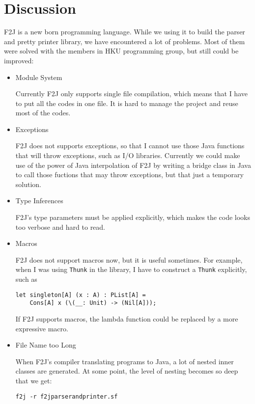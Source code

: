 \chapter{Discussion}

F2J is a new born programming language. While we using it to build the parser and pretty printer library, we have encountered a lot of problems. Most of them were solved with the members in HKU programming group, but still could be improved:

\begin{itemize}
\item Module System

Currently F2J only supports single file compilation, which means that I have to put all the codes in one file. It is hard to manage the project and reuse most of the codes. 

\item Exceptions

F2J does not supports exceptions, so that I cannot use those Java functions that will throw exceptions, such as I/O libraries. Currently we could make use of the power of Java interpolation of F2J by writing a bridge class in Java to call those fuctions that may throw exceptions, but that just a temporary solution.

\item Type Inferences

F2J's type parameters must be applied explicitly, which makes the code looks too verbose and hard to read.

\item Macros

F2J does not support macros now, but it is useful sometimes. For example, when I was using \texttt{Thunk} in the library, I have to construct a \texttt{Thunk} explicitly, such as

\begin{lstlisting}
let singleton[A] (x : A) : PList[A] =
    Cons[A] x (\(__: Unit) -> (Nil[A]));
\end{lstlisting}

If F2J supports macros, the lambda function could be replaced by a more expressive macro.

\item File Name too Long

When F2J's compiler translating programs to Java, a lot of nested inner classes are generated. At some point, the level of nesting becomes so deep that we get:

\begin{lstlisting}
f2j -r f2jparserandprinter.sf


\end{lstlisting}
\end{itemize}
